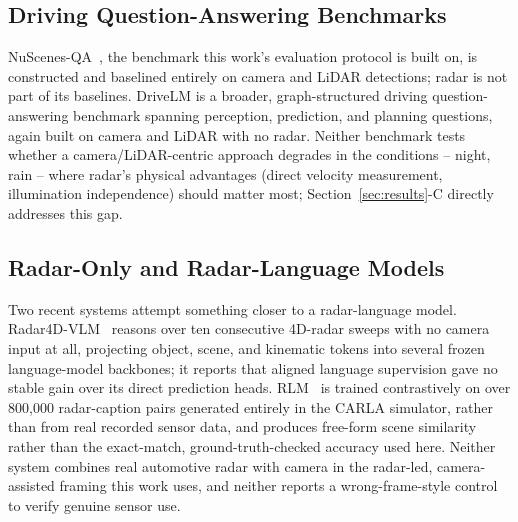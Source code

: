 \documentclass[conference]{IEEEtran}
\begin{document}
\subsection{Driving Question-Answering Benchmarks}
NuScenes-QA~\cite{qian2024nuscenesqa}, the benchmark this work's evaluation protocol is built on, is constructed
and baselined entirely on camera and LiDAR detections; radar is not part of its baselines. DriveLM
\cite{sima2024drivelm} is a broader, graph-structured driving question-answering benchmark spanning perception,
prediction, and planning questions, again built on camera and LiDAR with no radar. Neither benchmark tests
whether a camera/LiDAR-centric approach degrades in the conditions -- night, rain -- where radar's physical
advantages (direct velocity measurement, illumination independence) should matter most; Section~\ref{sec:results}-C
directly addresses this gap.

\subsection{Radar-Only and Radar-Language Models}
Two recent systems attempt something closer to a radar-language model. Radar4D-VLM~\cite{han2026radar4dvlm}
reasons over ten consecutive 4D-radar sweeps with no camera input at all, projecting object, scene, and kinematic
tokens into several frozen language-model backbones; it reports that aligned language supervision gave no stable
gain over its direct prediction heads. RLM~\cite{mishra2025rlm} is trained contrastively on over 800,000
radar-caption pairs generated entirely in the CARLA simulator, rather than from real recorded sensor data, and
produces free-form scene similarity rather than the exact-match, ground-truth-checked accuracy used here. Neither
system combines real automotive radar with camera in the radar-led, camera-assisted framing this work uses, and
neither reports a wrong-frame-style control to verify genuine sensor use.
\end{document}
